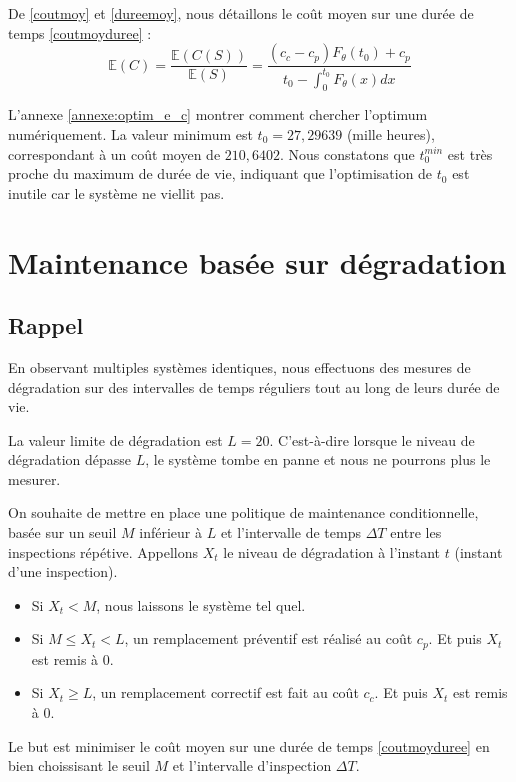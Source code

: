 \documentclass[10pt,a4paper]{article}
\begin{document}
De \eqref{coutmoy} et \eqref{dureemoy}, nous détaillons le coût moyen sur une durée de temps \eqref{coutmoyduree} :
\begin{equation}
    \label{coutmoydureedet}
    \mathbb{E}\left( C \right) = \frac{{\mathbb{E}\left( {C\left( S \right)} \right)}}{{\mathbb{E}\left( S \right)}} = \frac{{\left( {{c_c} - {c_p}} \right){F_\theta }\left( {{t_0}} \right) + {c_p}}}{{{t_0} - \int_0^{{t_0}} {{F_\theta }\left( x \right)dx} }}
\end{equation}

L'annexe \eqref{annexe:optim_e_c} montrer comment chercher l'optimum numériquement. La valeur minimum est $t_0 = 27,29639$ (mille heures), correspondant à un coût moyen de $210,6402$. Nous constatons que $t_0^{min}$ est très proche du maximum de durée de vie, indiquant que l'optimisation de $t_0$ est inutile car le système ne viellit pas.

\section{Maintenance basée sur dégradation}
\subsection{Rappel}
En observant multiples systèmes identiques, nous effectuons des mesures de dégradation sur des intervalles de temps réguliers tout au long de leurs durée de vie.

La valeur limite de dégradation est $L=20$. C'est-à-dire lorsque le niveau de dégradation dépasse $L$, le système tombe en panne et nous ne pourrons plus le mesurer.

On souhaite de mettre en place une politique de maintenance conditionnelle, basée sur un seuil $M$ inférieur à $L$ et l'intervalle de temps $\Delta T$ entre les inspections répétive. Appellons $X_t$ le niveau de dégradation à l'instant $t$ (instant d'une inspection).
\begin{itemize}
    \item Si $X_t < M$, nous laissons le système tel quel.
    \item Si $M \leq X_t < L$, un remplacement préventif est réalisé au coût $c_p$. Et puis $X_t$ est remis à $0$.
    \item Si $X_t \geq L$, un remplacement correctif est fait au coût $c_c$. Et puis $X_t$ est remis à $0$.
\end{itemize}

Le but est minimiser le coût moyen sur une durée de temps \eqref{coutmoyduree} en bien choissisant le seuil $M$ et l'intervalle d'inspection $\Delta T$.
\end{document}
